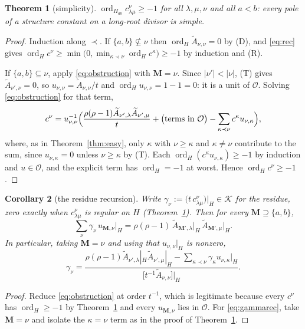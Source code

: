 \documentclass[11pt]{article}
\theoremstyle{plain}
\newtheorem{thm}{Theorem}
\newtheorem{cor}[thm]{Corollary}
\theoremstyle{definition}
\theoremstyle{remark}
\theoremstyle{plain}
\newcommand{\bM}{\mathbf{M}}
\newcommand{\At}{\widetilde{A}}
\newcommand{\ord}{\operatorname{ord}}
\begin{document}
\begin{thm}[simplicity]\label{thm:simple}
$\ord_{H_{ab}}c^{\nu}_{\lambda\mu}\ge-1$ for all $\lambda,\mu,\nu$ and all
$a<b$: every pole of a structure constant on a long-root divisor is simple.
\end{thm}
\begin{proof}
Induction along $\prec$.  If $\{a,b\}\not\subseteq\nu$ then
$\ord_H\At_{\nu,\nu}=0$ by (D), and \eqref{eq:rec} gives
$\ord_Hc^{\nu}\ge\min\bigl(0,\min_{\kappa\prec\nu}\ord_Hc^{\kappa}\bigr)\ge-1$
by induction and (R).

If $\{a,b\}\subseteq\nu$, apply \eqref{eq:obstruction} with $\bM=\nu$.  Since
$|\nu'|<|\nu|$, (T) gives $\At_{\nu',\nu}=0$, so
$u_{\nu,\nu}=\At_{\nu,\nu}/t$ and $\ord_Hu_{\nu,\nu}=1-1=0$: it is a unit of
$\mathcal{O}$.  Solving \eqref{eq:obstruction} for that term,
\[
c^{\nu}=u_{\nu,\nu}^{-1}\Bigl(
\frac{\rho(\rho-1)\At_{\nu',\lambda}\At_{\nu',\mu}}{t}
+\bigl(\text{terms in }\mathcal{O}\bigr)
-\sum_{\kappa\prec\nu}c^{\kappa}u_{\nu,\kappa}\Bigr),
\]
where, as in Theorem~\ref{thm:easy}, only $\kappa$ with $\nu\ge\kappa$ and
$\kappa\ne\nu$ contribute to the sum, since $u_{\nu,\kappa}=0$ unless
$\nu\ge\kappa$ by (T).  Each $\ord_H(c^{\kappa}u_{\nu,\kappa})\ge-1$ by
induction and $u\in\mathcal{O}$, and the explicit term has $\ord_H=-1$ at
worst.  Hence $\ord_Hc^{\nu}\ge-1$.
\end{proof}

\begin{cor}[the residue recursion]\label{cor:resrec}
Write $\gamma_{\nu}:=\bigl(t\,c^{\nu}_{\lambda\mu}\bigr)\big|_H\in\mathcal{K}$
for the residue, zero exactly when $c^{\nu}_{\lambda\mu}$ is regular on $H$
(Theorem~\ref{thm:simple}).  Then for every $\bM\supseteq\{a,b\}$,
\begin{equation}
\sum_{\nu}\gamma_{\nu}\,u_{\bM,\nu}\big|_H
=\rho(\rho-1)\,\At_{\bM',\lambda}\big|_H\,\At_{\bM',\mu}\big|_H .
\label{eq:resrec}
\end{equation}
In particular, taking $\bM=\nu$ and using that $u_{\nu,\nu}|_H$ is nonzero,
\begin{equation}
\gamma_{\nu}=\frac{\rho(\rho-1)\At_{\nu',\lambda}|_H\At_{\nu',\mu}|_H
-\sum_{\kappa\prec\nu}\gamma_{\kappa}u_{\nu,\kappa}|_H}
{\bigl[t^{-1}\At_{\nu,\nu}\bigr]\big|_H}.
\label{eq:gammarec}
\end{equation}
\end{cor}
\begin{proof}
Reduce \eqref{eq:obstruction} at order $t^{-1}$, which is legitimate because
every $c^{\nu}$ has $\ord_H\ge-1$ by Theorem~\ref{thm:simple} and every
$u_{\bM,\nu}$ lies in $\mathcal{O}$.  For \eqref{eq:gammarec}, take $\bM=\nu$
and isolate the $\kappa=\nu$ term as in the proof of
Theorem~\ref{thm:simple}.
\end{proof}
\end{document}
